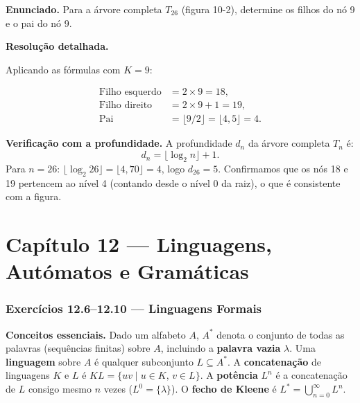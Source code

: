 \documentclass[12pt,a4paper]{article}
\newcommand{\keyword}[1]{\textbf{\textcolor{azul}{#1}}}
\begin{document}
\medskip
\textbf{Enunciado.} Para a árvore completa $T_{26}$ (figura 10-2), determine os filhos
do nó 9 e o pai do nó 9.

\medskip
\textbf{Resolução detalhada.}

Aplicando as fórmulas com $K = 9$:

\begin{align*}
  \text{Filho esquerdo} &= 2 \times 9 = 18,\\
  \text{Filho direito}  &= 2 \times 9 + 1 = 19,\\
  \text{Pai}            &= \lfloor 9/2 \rfloor = \lfloor 4{,}5 \rfloor = 4.
\end{align*}

\noindent\textbf{Verificação com a profundidade.} A profundidade $d_n$ da árvore
completa $T_n$ é:
\[
  d_n = \lfloor \log_2 n \rfloor + 1.
\]
Para $n = 26$: $\lfloor \log_2 26 \rfloor = \lfloor 4{,}70 \rfloor = 4$, logo $d_{26} = 5$.
Confirmamos que os nós 18 e 19 pertencem ao nível 4 (contando desde o nível 0 da raiz),
o que é consistente com a figura.

\newpage
\part*{Capítulo 12 — Linguagens, Autómatos e Gramáticas}

\section*{Exercícios 12.6--12.10 — Linguagens Formais}

\begin{teoriacaixa}
\textbf{Conceitos essenciais.}
Dado um alfabeto $A$, $A^*$ denota o conjunto de todas as palavras (sequências finitas)
sobre $A$, incluindo a \keyword{palavra vazia} $\lambda$.
Uma \keyword{linguagem} sobre $A$ é qualquer subconjunto $L \subseteq A^*$.
A \keyword{concatenação} de linguagens $K$ e $L$ é $KL = \{uv \mid u \in K,\, v \in L\}$.
A \keyword{potência} $L^n$ é a concatenação de $L$ consigo mesmo $n$ vezes ($L^0 = \{\lambda\}$).
O \keyword{fecho de Kleene} é $L^* = \bigcup_{n=0}^{\infty} L^n$.
\end{teoriacaixa}
\end{document}

